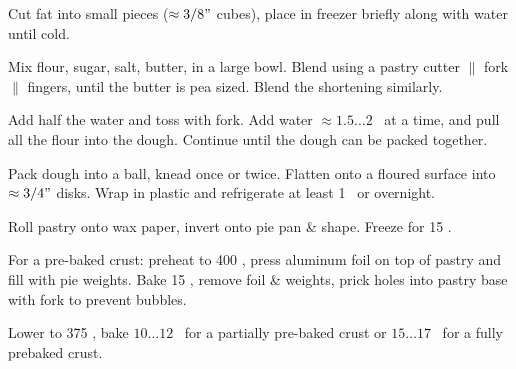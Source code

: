 \begin{preparation}
\item Cut fat into small pieces ($\approx 3/8"$ cubes), place in freezer briefly along with water until cold.

\item Mix flour, sugar, salt, butter, in a large bowl.
	Blend using a pastry cutter $\|$ fork $\|$ fingers, until the butter is pea sized.
	Blend the shortening similarly.

\item Add half the water and toss with fork.
	Add water $\approx 1.5 \dots 2$ \Tablespoon~at a time, and pull all the flour into the dough.
	Continue until the dough can be packed together.

\item Pack dough into a ball, knead once or twice.
	Flatten onto a floured surface into $\approx 3/4"$ disks.
	Wrap in plastic and refrigerate at least 1 \hour~or overnight.

\item Roll pastry onto wax paper, invert onto pie pan \& shape.
	Freeze for 15 \minute.

\item For a pre-baked crust: preheat to 400 \Fahrenheit, press aluminum foil on top of pastry and fill with pie weights.
	Bake 15 \minute, remove foil \& weights, prick holes into pastry base with fork to prevent bubbles.

\item Lower to 375 \Fahrenheit, bake $10 \dots 12$ \minute~for a partially pre-baked crust or $15 \dots 17$ \minute~for a fully prebaked crust.
\end{preparation}


\recipeend
